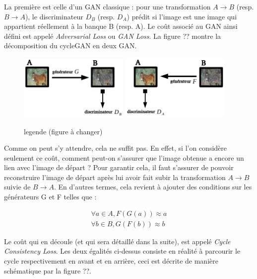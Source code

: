 La première est celle d'un GAN classique : pour une transformation $ A \rightarrow B $ (resp. $ B \rightarrow A $), le discriminateur $ D_B $ (resp. $ D_A $) prédit si l'image est une image qui appartient réellement à la banque B (resp. A). Le coût associé au GAN ainsi défini est appelé \textit{Adversarial Loss} ou \textit{GAN Loss}. La figure ?? montre la décomposition du cycleGAN en deux GAN. \\

\begin{figure}[!h]
\centering
\includegraphics[width=150pt]{"images/cycle_ganG"}
\hspace*{10mm}
\includegraphics[width=150pt]{"images/cycle_ganF"}
\caption{legende (figure à changer)}
\end{figure}

Comme on peut s'y attendre, cela ne suffit pas. En effet, si l'on considère seulement ce coût, comment peut-on s'assurer que l'image obtenue a encore un lien avec l'image de départ ? Pour garantir cela, il faut s'assurer de pouvoir reconstruire l'image de départ après lui avoir fait subir  la transformation $ A \rightarrow B $ suivie de $ B \rightarrow A $. En d'autres termes, cela revient à ajouter des conditions sur les générateurs G et F telles que :

\begin{equation}
\begin{split}
\forall a \in A, F(G(a)) \approx a \\
\forall b \in B, G(F(b)) \approx b
\end{split}
\end{equation}

Le coût qui en découle (et qui sera détaillé dans la suite), est appelé \textit{Cycle Consistency Loss}. Les deux égalités ci-dessus consiste en réalité à parcourir le cycle respectivement en avant et en arrière, ceci est décrite de manière schématique par la figure ??.\\

